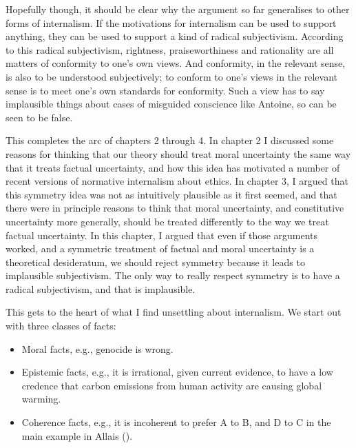 \documentclass[
  10pt,
  letterpaper,
  twoside]{scrbook}
\providecommand{\tightlist}{%
  \setlength{\itemsep}{0pt}\setlength{\parskip}{0pt}}\usepackage{longtable,booktabs,array}
\begin{document}
Hopefully though, it should be clear why the argument so far generalises
to other forms of internalism. If the motivations for internalism can be
used to support anything, they can be used to support a kind of radical
subjectivism. According to this radical subjectivism, rightness,
praiseworthiness and rationality are all matters of conformity to one's
own views. And conformity, in the relevant sense, is also to be
understood subjectively; to conform to one's views in the relevant sense
is to meet one's own standards for conformity. Such a view has to say
implausible things about cases of misguided conscience like {Antoine},
so can be seen to be false.

This completes the arc of chapters 2 through 4. In chapter 2 I discussed
some reasons for thinking that our theory should treat moral uncertainty
the same way that it treats factual uncertainty, and how this idea has
motivated a number of recent versions of normative internalism about
ethics. In chapter 3, I argued that this symmetry idea was not as
intuitively plausible as it first seemed, and that there were in
principle reasons to think that moral uncertainty, and constitutive
uncertainty more generally, should be treated differently to the way we
treat factual uncertainty. In this chapter, I argued that even if those
arguments worked, and a symmetric treatment of factual and moral
uncertainty is a theoretical desideratum, we should reject symmetry
because it leads to implausible subjectivism. The only way to really
respect symmetry is to have a radical subjectivism, and that is
implausible.

This gets to the heart of what I find unsettling about internalism. We
start out with three classes of facts:

\begin{itemize}
\tightlist
\item
  Moral facts, e.g., genocide is wrong.
\item
  Epistemic facts, e.g., it is irrational, given current evidence, to
  have a low credence that carbon emissions from human activity are
  causing global warming.
\item
  Coherence facts, e.g., it is incoherent to prefer A to B, and D to C
  in the main example in Allais ().
\end{itemize}
\end{document}
